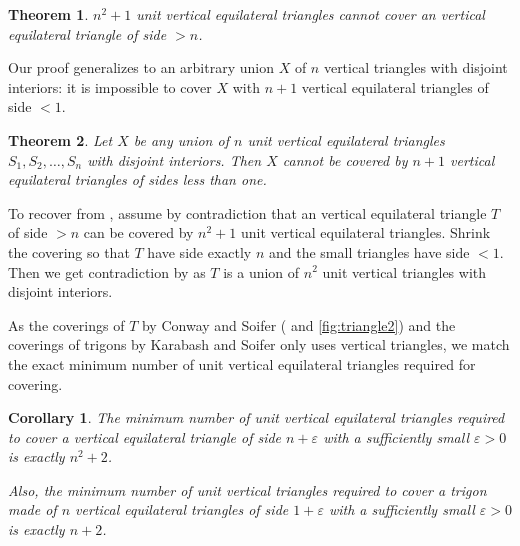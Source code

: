 \documentclass[a4paper]{amsart}
\theoremstyle{plain}
\newtheorem{theorem}{Theorem}
\newtheorem{corollary}{Corollary}
\theoremstyle{definition}
\begin{document}
\begin{theorem}

\(n^2 + 1\) unit vertical equilateral triangles cannot cover an vertical equilateral triangle of side \(> n\).

\label{thm:triangle-cover-cor}
\end{theorem}

Our proof generalizes to an arbitrary union \(X\) of \(n\) vertical triangles with disjoint interiors: it is impossible to cover \(X\) with \(n + 1\) vertical equilateral triangles of side \(< 1\).

\begin{theorem}

Let \(X\) be any union of \(n\) unit vertical equilateral triangles \(S_1, S_2, \dots, S_n\) with disjoint interiors. Then \(X\) cannot be covered by \(n + 1\) vertical equilateral triangles of sides less than one.

\label{thm:triangle-cover}
\end{theorem}

To recover  from , assume by contradiction that an vertical equilateral triangle \(T\) of side \(> n\) can be covered by \(n^2 + 1\) unit vertical equilateral triangles. Shrink the covering so that \(T\) have side exactly \(n\) and the small triangles have side \(< 1\). Then we get contradiction by  as \(T\) is a union of \(n^2\) unit vertical triangles with disjoint interiors.

As the coverings of \(T\) by Conway and Soifer ( and \ref{fig:triangle2}) and the coverings of trigons by Karabash and Soifer only uses vertical triangles,
we match the exact minimum number of unit vertical equilateral triangles required for covering.

\begin{corollary}

The minimum number of unit vertical equilateral triangles required to cover a vertical equilateral triangle of side \(n + \varepsilon\) with a sufficiently small $\varepsilon > 0$ is exactly \(n^2+2\).

Also, the minimum number of unit vertical triangles required to cover a trigon made of \(n\) vertical equilateral triangles of side \(1 + \varepsilon\) with a sufficiently small $\varepsilon > 0$ is exactly \(n + 2\).

\label{cor:triangle-cover-number}
\end{corollary}
\end{document}
